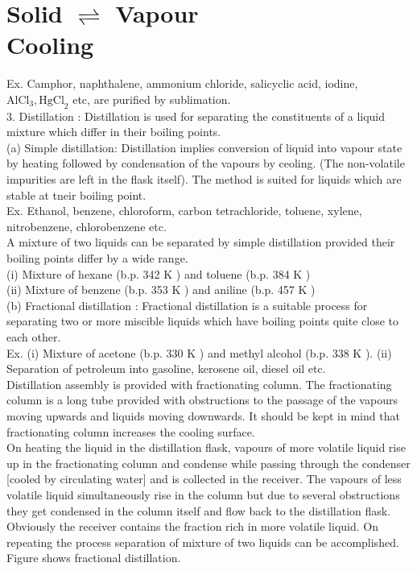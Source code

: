 \documentclass[10pt]{article}
\begin{document}
\section*{Solid $\rightleftharpoons$ Vapour \\
 Cooling}
Ex. Camphor, naphthalene, ammonium chloride, salicyclic acid, iodine, $\mathrm{AlCl}_{3}, \mathrm{HgCl}_{2}$ etc, are purified by sublimation.\\
3. Distillation : Distillation is used for separating the constituents of a liquid mixture which differ in their boiling points.\\
(a) Simple distillation: Distillation implies conversion of liquid into vapour state by heating followed by condensation of the vapours by ceoling. (The non-volatile impurities are left in the flask itself). The method is suited for liquids which are stable at tneir boiling point.\\
Ex. Ethanol, benzene, chloroform, carbon tetrachloride, toluene, xylene, nitrobenzene, chlorobenzene etc.\\
A mixture of two liquids can be separated by simple distillation provided their boiling points differ by a wide range.\\
(i) Mixture of hexane (b.p. 342 K ) and toluene (b.p. 384 K )\\
(ii) Mixture of benzene (b.p. 353 K ) and aniline (b.p. 457 K )\\
(b) Fractional distillation : Fractional distillation is a suitable process for separating two or more miscible liquids which have boiling points quite close to each other.\\
Ex. (i) Mixture of acetone (b.p. 330 K ) and methyl alcohol (b.p. 338 K ). (ii) Separation of petroleum into gasoline, kerosene oil, diesel oil etc.\\
Distillation assembly is provided with fractionating column. The fractionating column is a long tube provided with obstructions to the passage of the vapours moving upwards and liquids moving downwards. It should be kept in mind that fractionating column increases the cooling surface.\\[0pt]
On heating the liquid in the distillation flask, vapours of more volatile liquid rise up in the fractionating column and condense while passing through the condenser [cooled by circulating water] and is collected in the receiver. The vapours of less volatile liquid simultaneously rise in the column but due to several obstructions they get condensed in the column itself and flow back to the distillation flask. Obviously the receiver contains the fraction rich in more volatile liquid. On repeating the process separation of mixture of two liquids can be accomplished. Figure shows fractional distillation.\\
\end{document}
